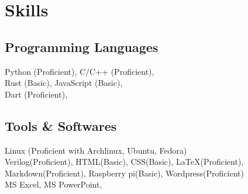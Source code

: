 \documentclass[]{m abbas resume' 2022}
\begin{document}
\begin{minipage}[t]{0.51\textwidth}
    
%

\section{Skills}

\subsection{Programming Languages}
Python (Proficient), 
C/C++ (Proficient), \\
Rust (Basic),
JavaScript (Basic),\\ 
Dart (Proficient), 

\subsection{Tools \& Softwares}
Linux (Proficient with Archlinux, Ubuntu, Fedora) \\ 
Verilog(Proficient), 
HTML(Basic),
CSS(Basic),
LaTeX(Proficient),
Markdown(Proficient), 
Raspberry pi(Basic), 
Wordpress(Proficient) \\
MS Excel, 
MS PowerPoint, 


\end{minipage}
\end{document}
